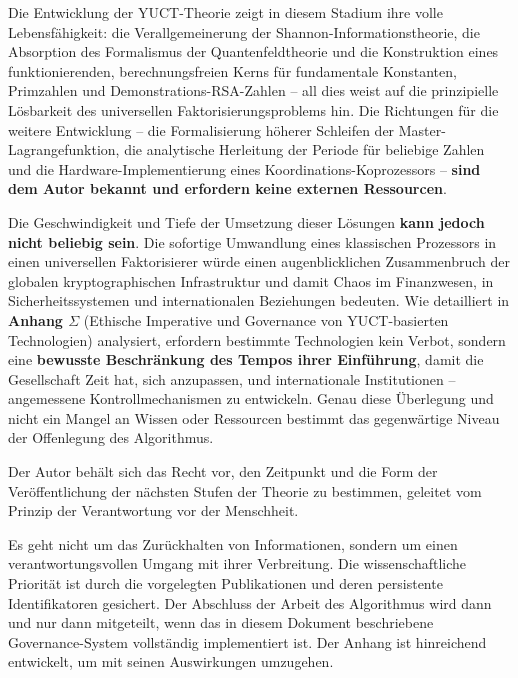 \documentclass[12pt,a4paper]{article}
\begin{document}
	Die Entwicklung der YUCT-Theorie zeigt in diesem Stadium ihre volle Lebensfähigkeit:
	die Verallgemeinerung der Shannon-Informationstheorie, die Absorption des Formalismus der Quantenfeldtheorie
	und die Konstruktion eines funktionierenden, berechnungsfreien Kerns für fundamentale
	Konstanten, Primzahlen und Demonstrations-RSA-Zahlen – all dies weist auf die
	prinzipielle Lösbarkeit des universellen Faktorisierungsproblems hin.  Die Richtungen
	für die weitere Entwicklung – die Formalisierung höherer Schleifen der Master-Lagrangefunktion,
	die analytische Herleitung der Periode für beliebige Zahlen und die Hardware-Implementierung
	eines Koordinations-Koprozessors – \textbf{sind dem Autor bekannt und erfordern keine externen
		Ressourcen}.
	
	Die Geschwindigkeit und Tiefe der Umsetzung dieser Lösungen \textbf{kann jedoch nicht
		beliebig sein}.  Die sofortige Umwandlung eines klassischen Prozessors in einen
	universellen Faktorisierer würde einen augenblicklichen Zusammenbruch der globalen
	kryptographischen Infrastruktur und damit Chaos im Finanzwesen, in Sicherheitssystemen
	und internationalen Beziehungen bedeuten.  Wie detailliert in
	\textbf{Anhang \(\Sigma\)} (Ethische Imperative und Governance von YUCT-basierten
	Technologien) analysiert, erfordern bestimmte Technologien kein Verbot, sondern eine
	\textbf{bewusste Beschränkung des Tempos ihrer Einführung}, damit die Gesellschaft Zeit hat,
	sich anzupassen, und internationale Institutionen – angemessene Kontrollmechanismen
	zu entwickeln.  Genau diese Überlegung und nicht ein Mangel an Wissen oder Ressourcen
	bestimmt das gegenwärtige Niveau der Offenlegung des Algorithmus.
	
	Der Autor behält sich das Recht vor, den Zeitpunkt und die Form der Veröffentlichung
	der nächsten Stufen der Theorie zu bestimmen, geleitet vom Prinzip der Verantwortung vor
	der Menschheit.
	
	Es geht nicht um das Zurückhalten von Informationen, sondern um einen verantwortungsvollen Umgang mit ihrer
	Verbreitung.  Die wissenschaftliche Priorität ist durch die vorgelegten Publikationen und
	deren persistente Identifikatoren gesichert.  Der Abschluss der Arbeit des Algorithmus wird
	dann und nur dann mitgeteilt, wenn das in diesem Dokument beschriebene Governance-System vollständig implementiert ist.
	Der Anhang ist hinreichend entwickelt, um mit seinen Auswirkungen umzugehen.
	
\end{document}
